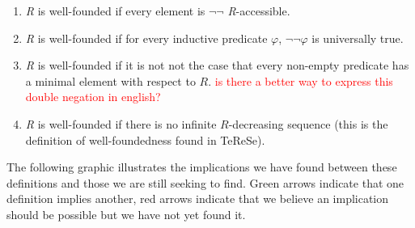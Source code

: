 \documentclass{scrartcl}
\begin{document}
\begin{enumerate}
    \item \textit{R} is well-founded if every element is $\lnot \lnot$  \textit{R}-accessible.
    \item \textit{R} is well-founded if for every inductive predicate $\varphi$, $\lnot \lnot \varphi$ is universally true.
    \item \textit{R} is well-founded if it is not not the case that every non-empty predicate has a minimal element with respect to $R$. \textcolor{red}{is there a better way to express this double negation in english?}
    \item \textit{R} is well-founded if there is no infinite $R$-decreasing sequence (this is the definition of well-foundedness found in TeReSe).
\end{enumerate}

The following graphic illustrates the implications we have found between these definitions and those we are still seeking to find. Green arrows indicate that one definition implies another, red arrows indicate that we believe an implication should be possible but we have not yet found it.
\end{document}

